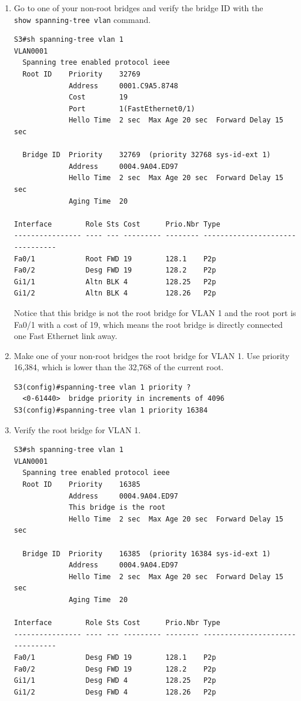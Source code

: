 \begin{enumerate}
\item
  Go to one of your
  non-root bridges and verify the bridge ID with the
  \texttt{show\ spanning-tree\ vlan} command.

\begin{verbatim}
S3#sh spanning-tree vlan 1
VLAN0001
  Spanning tree enabled protocol ieee
  Root ID    Priority    32769
             Address     0001.C9A5.8748
             Cost        19
             Port        1(FastEthernet0/1)
             Hello Time  2 sec  Max Age 20 sec  Forward Delay 15 sec
 
  Bridge ID  Priority    32769  (priority 32768 sys-id-ext 1)
             Address     0004.9A04.ED97
             Hello Time  2 sec  Max Age 20 sec  Forward Delay 15 sec
             Aging Time  20
 
Interface        Role Sts Cost      Prio.Nbr Type
---------------- ---- --- --------- -------- --------------------------------
Fa0/1            Root FWD 19        128.1    P2p
Fa0/2            Desg FWD 19        128.2    P2p
Gi1/1            Altn BLK 4         128.25   P2p
Gi1/2            Altn BLK 4         128.26   P2p
\end{verbatim}

  Notice that this bridge is not the root bridge for VLAN 1 and the root
  port is Fa0/1 with a cost of 19, which means the root bridge is
  directly connected one Fast Ethernet link away.
\item
  Make one of your non-root bridges the root bridge for VLAN 1. Use
  priority 16,384, which is lower than the 32,768 of the current root.

\begin{verbatim}
S3(config)#spanning-tree vlan 1 priority ?
  <0-61440>  bridge priority in increments of 4096
S3(config)#spanning-tree vlan 1 priority 16384
\end{verbatim}
\item
  Verify the root bridge for VLAN 1.

\begin{verbatim}
S3#sh spanning-tree vlan 1
VLAN0001
  Spanning tree enabled protocol ieee
  Root ID    Priority    16385
             Address     0004.9A04.ED97
             This bridge is the root
             Hello Time  2 sec  Max Age 20 sec  Forward Delay 15 sec
 
  Bridge ID  Priority    16385  (priority 16384 sys-id-ext 1)
             Address     0004.9A04.ED97
             Hello Time  2 sec  Max Age 20 sec  Forward Delay 15 sec
             Aging Time  20
 
Interface        Role Sts Cost      Prio.Nbr Type
---------------- ---- --- --------- -------- --------------------------------
Fa0/1            Desg FWD 19        128.1    P2p
Fa0/2            Desg FWD 19        128.2    P2p
Gi1/1            Desg FWD 4         128.25   P2p
Gi1/2            Desg FWD 4         128.26   P2p
\end{verbatim}
\end{enumerate}

